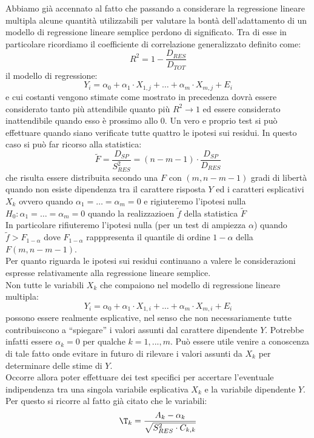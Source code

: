 \documentclass[a4paper,12pt, oneside]{book}
\begin{document}
Abbiamo già accennato al fatto che passando a considerare la regressione lineare
multipla alcune quantità utilizzabili per valutare la bontà dell'adattamento di un
modello di regressione lineare semplice perdono di significato. Tra di esse in particolare
ricordiamo il coefficiente di correlazione generalizzato definito come:
\[R^{2}=1-\frac{D_{R E S}}{D_{T O T}}\]
il modello di regressione:
\[Y_{i}=\alpha_{0}+\alpha_{1} \cdot X_{1, j}+\ldots+\alpha_{m} \cdot X_{m, j}+E_{i}\]
e cui costanti vengono stimate come mostrato in precedenza dovrà essere
considerato tanto più attendibile quanto più $R^2\rightarrow 1$ ed essere considerato inattendibile quando esso è prossimo allo 0.
Un vero e proprio test si può effettuare quando siano verificate tutte quattro le ipotesi sui
residui. In questo caso si può far ricorso alla statistica:
\[\tilde{F}=\frac{D_{S P}}{S_{R E S}^{2}}=(n-m-1) \cdot \frac{D_{S P}}{D_{R E S}}\]
che risulta essere distribuita secondo una $F$ con $(m,n-m-1)$ gradi di libertà quando
non esiste dipendenza tra il carattere risposta $Y$ ed i caratteri esplicativi $X_k$ ovvero
quando $\alpha_{1}=\ldots=\alpha_{m}=0$ e rigiuteremo l'ipotesi nulla $H_{0} : \alpha_{1}=\ldots=\alpha_{m}=0$ quando la realizzazioen $\tilde{f}$ della statistica $\tilde{F}$\\
In particolare rifiuteremo l'ipotesi nulla (per un test di ampiezza $\alpha$) quando $\tilde{f}>F_{1-\alpha}$ dove $F_{1-\alpha}$ rapppresenta il quantile di ordine $1-\alpha $ della $F(m, n-m-1)$.\\
Per quanto riguarda le ipotesi sui residui continuano a valere le considerazioni
espresse relativamente alla regressione lineare semplice.\\
Non tutte le variabili $ X_k$ che compaiono nel modello di regressione lineare multipla:
\[Y_{i}=\alpha_{0}+\alpha_{1} \cdot X_{1, i}+\ldots+\alpha_{m} \cdot X_{m, i}+E_{i}\]
possono essere realmente esplicative, nel senso che non necessariamente tutte
contribuiscono a “spiegare” i valori assunti dal carattere dipendente $Y$.
Potrebbe infatti essere $\alpha_k=0$ per qualche $k=1,...,m$. Può essere utile venire a conoscenza di tale fatto onde evitare in futuro di rilevare i
valori assunti da $X_k$ per determinare delle stime di $Y$.\\
Occorre allora poter effettuare dei test specifici per accertare l'eventuale indipendenza
tra una singola variabile esplicativa $X_k$ e la variabile dipendente $Y$.
Per questo si ricorre al fatto già citato che le variabili:
\[\T_{k}=\frac{A_{k}-\alpha_{k}}{\sqrt{S_{R E S}^{2} \cdot C_{k, k}}}\]
\end{document}
